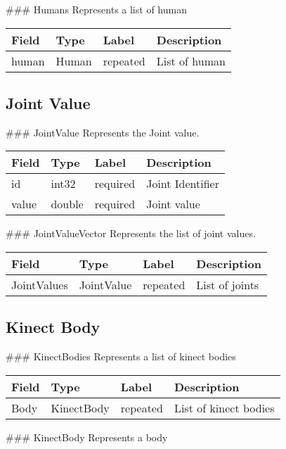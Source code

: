  \#\#\# Humans Represents a list of human

\begin{longtable}[c]{@{}llll@{}}
\toprule
Field & Type & Label & Description\tabularnewline
\midrule
\endhead
human & Human & repeated & List of human\tabularnewline
\bottomrule
\end{longtable}

\subsection{Joint Value}\label{jointux5fvalueux5fmap.proto}

 \#\#\# JointValue Represents the Joint value.

\begin{longtable}[c]{@{}llll@{}}
\toprule
Field & Type & Label & Description\tabularnewline
\midrule
\endhead
id & int32 & required & Joint Identifier\tabularnewline
value & double & required & Joint value\tabularnewline
\bottomrule
\end{longtable}

 \#\#\# JointValueVector Represents the list of joint values.

\begin{longtable}[c]{@{}llll@{}}
\toprule
Field & Type & Label & Description\tabularnewline
\midrule
\endhead
JointValues & JointValue & repeated & List of joints\tabularnewline
\bottomrule
\end{longtable}

 \subsection{Kinect Body}\label{kinectux5fbody.proto}

 \#\#\# KinectBodies Represents a list of kinect bodies

\begin{longtable}[c]{@{}llll@{}}
\toprule
Field & Type & Label & Description\tabularnewline
\midrule
\endhead
Body & KinectBody & repeated & List of kinect bodies\tabularnewline
\bottomrule
\end{longtable}

 \#\#\# KinectBody Represents a body

